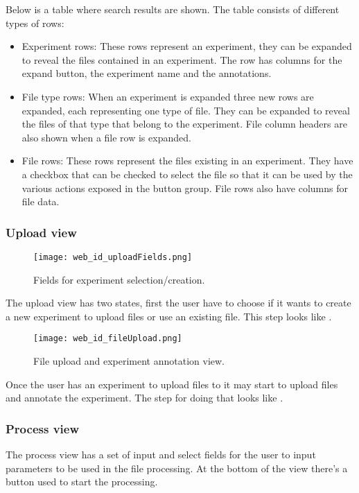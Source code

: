 Below is a table where search results are shown. The table consists of different types of rows:
\begin{itemize}
	\item Experiment rows: These rows represent an experiment, they can be expanded to reveal the files contained in an experiment. The row has columns for the expand button, the experiment name and the annotations.
	\item File type rows: When an experiment is expanded three new rows are expanded, each representing one type of file. They can be expanded to reveal the files of that type that belong to the experiment. File column headers are also shown when a file row is expanded.
	\item File rows: These rows represent the files existing in an experiment. They have a checkbox that can be checked to select the file so that it can be used by the various actions exposed in the button group. File rows also have columns for file data.
\end{itemize}

\subsubsection{Upload view}
\begin{figure}[h]
\centering
\texttt{[image: web\_id\_uploadFields.png]}
\caption{\label{fig:web_id_uploadFields}Fields for experiment selection/creation.}
\end{figure}
The upload view has two states, first the user have to choose if it wants to create a new experiment to upload files or use an existing file. This step looks like .

\begin{figure}[h]
\centering
\texttt{[image: web\_id\_fileUpload.png]}
\caption{\label{fig:web_id_fileUpload}File upload and experiment annotation view.}
\end{figure}

Once the user has an experiment to upload files to it may start to upload files and annotate the experiment. The step for doing that looks like .

\subsubsection{Process view}
The process view has a set of input and select fields for the user to input parameters to be used in the file processing. At the bottom of the view there’s a button used to start the processing.
